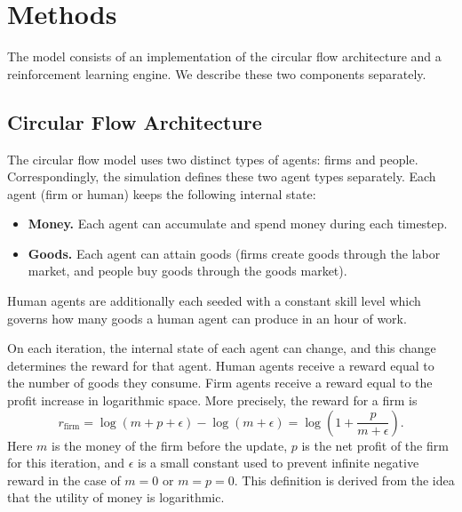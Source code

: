 \documentclass[twoside,twocolumn]{article}
\begin{document}
\section{Methods}

The model consists of an implementation of the circular flow architecture and a reinforcement learning engine. We describe these two components separately.

\subsection{Circular Flow Architecture}

The circular flow model uses two distinct types of agents: firms and people. Correspondingly, the simulation defines these two agent types separately. Each agent (firm or human) keeps the following internal state:
\begin{itemize}
  \item \textbf{Money.} Each agent can accumulate and spend money during each timestep.
  \item \textbf{Goods.} Each agent can attain goods (firms create goods through the labor market, and people buy goods through the goods market).
\end{itemize}
Human agents are additionally each seeded with a constant skill level which governs how many goods a human agent can produce in an hour of work. 

\medskip

On each iteration, the internal state of each agent can change, and this change determines the reward for that agent. Human agents receive a reward equal to the number of goods they consume. Firm agents receive a reward equal to the profit increase in logarithmic space. More precisely, the reward for a firm is 
\[
  r_\text{firm} = \log (m + p + \epsilon) - \log(m + \epsilon) = \log\left(1 + \frac{p}{m + \epsilon}\right).  
\]
Here $m$ is the money of the firm before the update, $p$ is the net profit of the firm for this iteration, and $\epsilon$ is a small constant used to prevent infinite negative reward in the case of $m = 0$ or $m = p = 0$. This definition is derived from the idea that the utility of money is logarithmic.


\medskip
\end{document}
